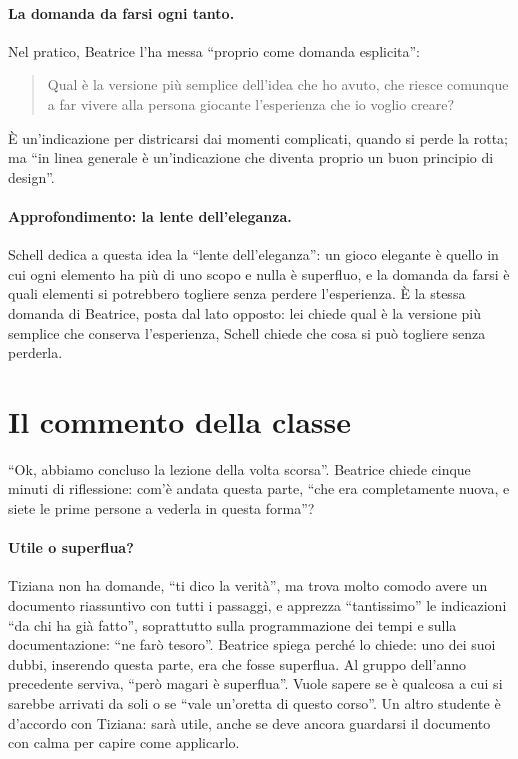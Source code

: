 \paragraph{La domanda da farsi ogni tanto.} Nel pratico, Beatrice l'ha messa ``proprio
come domanda esplicita'':
\begin{quote}
Qual è la versione più semplice dell'idea che ho avuto, che riesce comunque a far
vivere alla persona giocante l'esperienza che io voglio creare?
\end{quote}
È un'indicazione per districarsi dai momenti complicati, quando si perde la rotta; ma
``in linea generale è un'indicazione che diventa proprio un buon principio di
design''.

\paragraph{Approfondimento: la lente dell'eleganza.} Schell dedica a questa idea la
``lente dell'eleganza'': un gioco elegante è quello in cui ogni elemento ha più di
uno scopo e nulla è superfluo, e la domanda da farsi è quali elementi si potrebbero
togliere senza perdere l'esperienza. È la stessa domanda di Beatrice, posta dal
lato opposto: lei chiede qual è la versione più semplice che conserva l'esperienza,
Schell chiede che cosa si può togliere senza perderla.

\section{Il commento della classe}
\label{a9:sec:feedbackpm}

``Ok, abbiamo concluso la lezione della volta scorsa''. Beatrice chiede cinque minuti
di riflessione: com'è andata questa parte, ``che era completamente nuova, e siete le
prime persone a vederla in questa forma''?

\paragraph{Utile o superflua?} Tiziana non ha domande, ``ti dico la verità'', ma
trova molto comodo avere un documento riassuntivo con tutti i passaggi, e apprezza
``tantissimo'' le indicazioni ``da chi ha già fatto'', soprattutto sulla
programmazione dei tempi e sulla documentazione: ``ne farò tesoro''. Beatrice spiega
perché lo chiede: uno dei suoi dubbi, inserendo questa parte, era che fosse
superflua. Al gruppo dell'anno precedente serviva, ``però magari è superflua''. Vuole
sapere se è qualcosa a cui si sarebbe arrivati da soli o se ``vale un'oretta di questo
corso''. Un altro studente è d'accordo con Tiziana: sarà utile, anche se deve ancora
guardarsi il documento con calma per capire come applicarlo.

